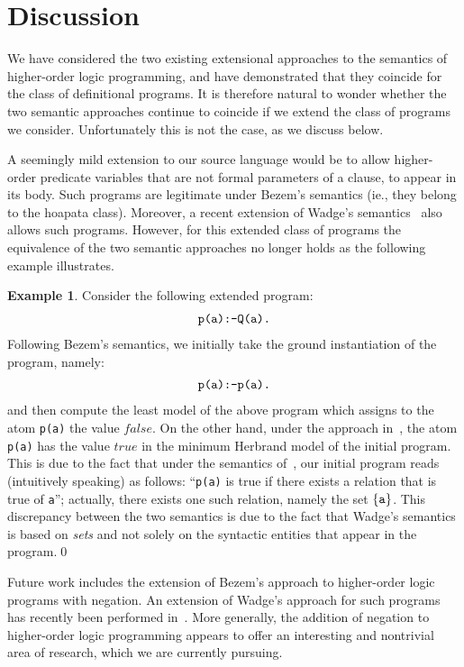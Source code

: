 \documentclass[submission,copyright]{eptcs}
\theoremstyle{definition}
\newtheorem{example}{Example}
\begin{document}
\section{Discussion}
\label{sec:concl}
\label{section5}
We have considered the two existing extensional approaches to the semantics of higher-order
logic programming, and have demonstrated that they coincide for the class of definitional
programs. It is therefore natural to wonder whether the two semantic approaches continue
to coincide if we extend the class of programs we consider. Unfortunately this is not
the case, as we discuss below.

A seemingly mild extension to our source language would be to allow higher-order predicate
variables that are not formal parameters of a clause, to appear in its body. Such programs
are legitimate under Bezem's semantics (ie., they belong to the hoapata class). Moreover,
a recent extension of Wadge's semantics~\cite{CharalambidisHRW13} also allows such programs.
However, for this extended class of programs the equivalence of the two semantic approaches
no longer holds as the following example illustrates.
\begin{example}
Consider the following extended program:
\[
\begin{array}{l}
\mbox{\tt p(a):-Q(a).}
\end{array}
\]
Following Bezem's semantics, we initially take the ground instantiation of the program, namely:
\[
\begin{array}{l}
\mbox{\tt p(a):-p(a).}
\end{array}
\]
and then compute the least model of the above program which assigns to the atom
{\tt p(a)} the value $\mathit{false}$. On the other hand, under the approach
in~\cite{CharalambidisHRW13}, the atom {\tt p(a)} has the value $\mathit{true}$
in the minimum Herbrand model of the initial program. This is due to the fact that
under the semantics of~\cite{CharalambidisHRW13}, our initial program reads (intuitively
speaking) as follows: ``{\tt p(a)} is true if there exists a relation that is
true of {\tt a}''; actually, there exists one such relation, namely the set $\{{\tt a}\}$.
This discrepancy between the two semantics is due to the fact that Wadge's semantics is
based on {\em sets} and not solely on the syntactic entities that appear in the
program.\qed
\end{example}


Future work includes the extension of Bezem's approach to higher-order logic programs
with negation. An extension of Wadge's approach for such programs has recently
been performed in~\cite{CharalambidisER14}. More generally, the addition of negation
to higher-order logic programming appears to offer an interesting and nontrivial
area of research, which we are currently pursuing.




\appendix
\end{document}
